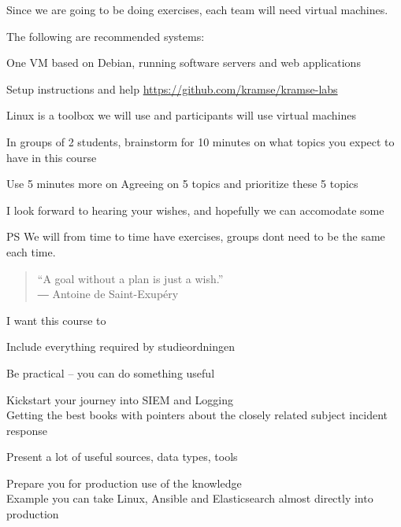 \documentclass[Screen16to9,17pt]{foils}
\begin{document}
Since we are going to be doing exercises, each team will need virtual machines.

The following are recommended systems:
\begin{list2}
\item One VM based on Debian, running software servers and web applications
\item Setup instructions and help \url{https://github.com/kramse/kramse-labs}
\end{list2}

Linux is a toolbox we will use and participants will use virtual machines





In groups of 2 students, brainstorm for 10 minutes on what topics you expect to have in this course

Use 5 minutes more on Agreeing on 5 topics and prioritize these 5 topics

I look forward to hearing your wishes, and hopefully we can accomodate some

\vskip 1cm
PS We will from time to time have exercises, groups dont need to be the same each time.



\begin{quote}
  “A goal without a plan is just a wish.”\\
  ― Antoine de Saint-Exupéry
\end{quote}

I want this course to
\begin{list2}
\item Include everything required by studieordningen
\item Be practical -- you can do something useful
\item Kickstart your journey into SIEM and Logging\\
Getting the best books with pointers about the closely related subject incident response
\item Present a lot of useful sources, data types, tools
\item Prepare you for production use of the knowledge\\
Example you can take Linux, Ansible and Elasticsearch almost directly into production
\end{list2}
\end{document}
